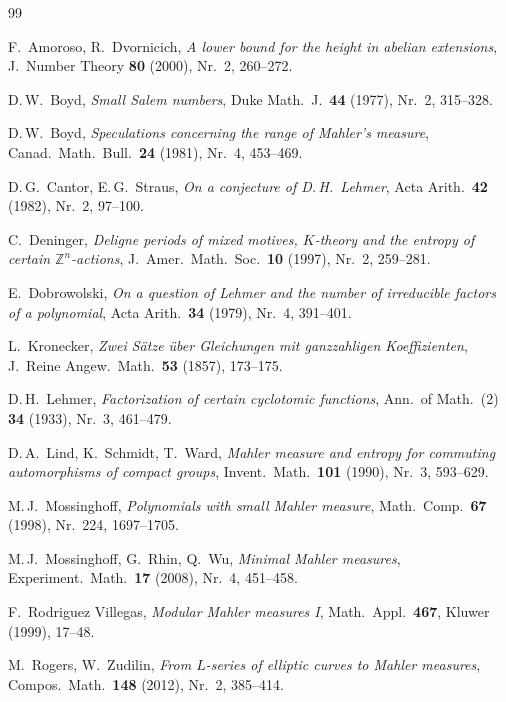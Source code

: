 \documentclass[12pt,a4paper]{amsart}
\theoremstyle{definition}
\theoremstyle{remark}
\begin{document}
\begin{thebibliography}{99}

F.\ Amoroso, R.\ Dvornicich,
\textit{A lower bound for the height in abelian extensions},
J.\ Number Theory \textbf{80} (2000), Nr.\ 2, 260--272.

D.\,W.\ Boyd,
\textit{Small Salem numbers},
Duke Math.\ J.\ \textbf{44} (1977), Nr.\ 2, 315--328.

D.\,W.\ Boyd,
\textit{Speculations concerning the range of Mahler's measure},
Canad.\ Math.\ Bull.\ \textbf{24} (1981), Nr.\ 4, 453--469.

D.\,G.\ Cantor, E.\,G.\ Straus,
\textit{On a conjecture of D.\,H.\ Lehmer},
Acta Arith.\ \textbf{42} (1982), Nr.\ 2, 97--100.

C.\ Deninger,
\textit{Deligne periods of mixed motives, $K$-theory and the entropy of certain
$\mathbb{Z}^n$-actions},
J.\ Amer.\ Math.\ Soc.\ \textbf{10} (1997), Nr.\ 2, 259--281.

E.\ Dobrowolski,
\textit{On a question of Lehmer and the number of irreducible factors of a polynomial},
Acta Arith.\ \textbf{34} (1979), Nr.\ 4, 391--401.

L.\ Kronecker,
\textit{Zwei Sätze über Gleichungen mit ganzzahligen Koeffizienten},
J.\ Reine Angew.\ Math.\ \textbf{53} (1857), 173--175.

D.\,H.\ Lehmer,
\textit{Factorization of certain cyclotomic functions},
Ann.\ of Math.\ (2) \textbf{34} (1933), Nr.\ 3, 461--479.

D.\,A.\ Lind, K.\ Schmidt, T.\ Ward,
\textit{Mahler measure and entropy for commuting automorphisms of compact groups},
Invent.\ Math.\ \textbf{101} (1990), Nr.\ 3, 593--629.

M.\,J.\ Mossinghoff,
\textit{Polynomials with small Mahler measure},
Math.\ Comp.\ \textbf{67} (1998), Nr.\ 224, 1697--1705.

M.\,J.\ Mossinghoff, G.\ Rhin, Q.\ Wu,
\textit{Minimal Mahler measures},
Experiment.\ Math.\ \textbf{17} (2008), Nr.\ 4, 451--458.

F.\ Rodriguez Villegas,
\textit{Modular Mahler measures I},
Math.\ Appl.\ \textbf{467}, Kluwer (1999), 17--48.

M.\ Rogers, W.\ Zudilin,
\textit{From $L$-series of elliptic curves to Mahler measures},
Compos.\ Math.\ \textbf{148} (2012), Nr.\ 2, 385--414.


\end{thebibliography}
\end{document}
